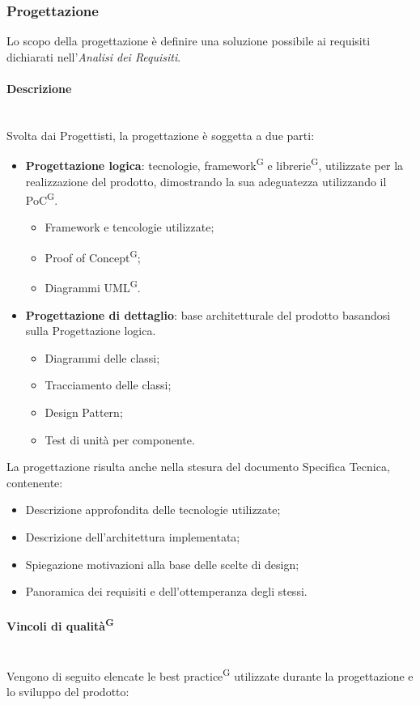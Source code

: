 \documentclass[8pt]{article}
\newcommand{\glossterm}[1]{#1\textsuperscript{G}} %
\newcommand{\subsubsubsection}[1]{\paragraph{#1}\mbox{}\\}
\begin{document}
\subsubsection{Progettazione} \label{sec:progettazione}
Lo scopo della progettazione è definire una soluzione possibile ai requisiti dichiarati nell'\textit{Analisi dei Requisiti}.
\subsubsubsection{Descrizione}
Svolta dai Progettisti, la progettazione è soggetta a due parti:
\begin{itemize}
    \item{\textbf{Progettazione logica}:} tecnologie, \glossterm{framework} e \glossterm{librerie}, utilizzate per la realizzazione del prodotto, dimostrando la sua adeguatezza utilizzando il \glossterm{PoC}.
    \begin{itemize}
        \item Framework e tencologie utilizzate;
        \item \glossterm{Proof of Concept};
        \item Diagrammi \glossterm{UML}.
    \end{itemize}
    \item{\textbf{Progettazione di dettaglio}:} base architetturale del prodotto basandosi sulla Progettazione logica.
    \begin{itemize}
        \item Diagrammi delle classi;
        \item Tracciamento delle classi;
        \item Design Pattern;
        \item Test di unità per componente.
    \end{itemize}
\end{itemize}
La progettazione risulta anche nella stesura del documento Specifica Tecnica, contenente:
\begin{itemize}
    \item Descrizione approfondita delle tecnologie utilizzate;
    \item Descrizione dell'architettura implementata;
    \item Spiegazione motivazioni alla base delle scelte di design;
    \item Panoramica dei requisiti e dell'ottemperanza degli stessi.
\end{itemize}
\subsubsubsection{Vincoli di \glossterm{qualità}}
Vengono di seguito elencate le \glossterm{best practice} utilizzate durante la progettazione e lo sviluppo del prodotto:
\end{document}
